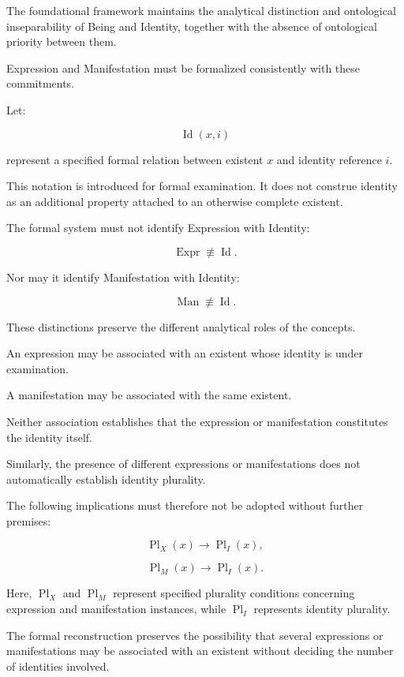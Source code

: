 The foundational framework
maintains the analytical
distinction and ontological
inseparability of Being and
Identity, together with the
absence of ontological priority
between them.

Expression and Manifestation
must be formalized consistently
with these commitments.

Let:

\[
    \operatorname{Id}(x,i)
\]

represent a specified formal
relation between existent \(x\)
and identity reference \(i\).

This notation is introduced
for formal examination. It
does not construe identity
as an additional property
attached to an otherwise
complete existent.

The formal system must not
identify Expression with
Identity:

\[
    \operatorname{Expr}
    \not\equiv
    \operatorname{Id}.
\]

Nor may it identify
Manifestation with Identity:

\[
    \operatorname{Man}
    \not\equiv
    \operatorname{Id}.
\]

These distinctions preserve
the different analytical
roles of the concepts.

An expression may be associated
with an existent whose identity
is under examination.

A manifestation may be associated
with the same existent.

Neither association establishes
that the expression or
manifestation constitutes
the identity itself.

Similarly, the presence of
different expressions or
manifestations does not
automatically establish
identity plurality.

The following implications
must therefore not be adopted
without further premises:

\[
    \operatorname{Pl}_{X}(x)
    \rightarrow
    \operatorname{Pl}_{I}(x),
\]

\[
    \operatorname{Pl}_{M}(x)
    \rightarrow
    \operatorname{Pl}_{I}(x).
\]

Here, \(\operatorname{Pl}_{X}\)
and \(\operatorname{Pl}_{M}\)
represent specified plurality
conditions concerning expression
and manifestation instances,
while \(\operatorname{Pl}_{I}\)
represents identity plurality.

The formal reconstruction
preserves the possibility
that several expressions
or manifestations may be
associated with an existent
without deciding the number
of identities involved.


